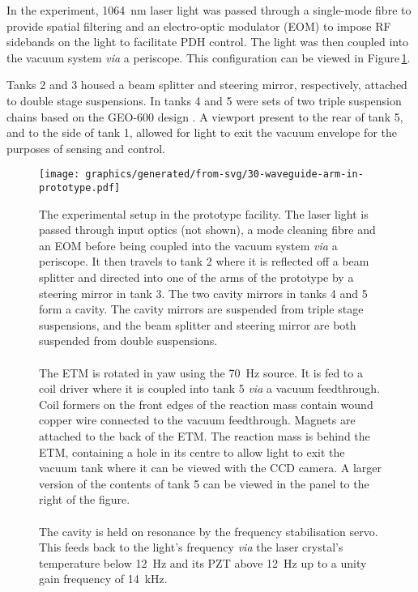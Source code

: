 In the experiment, \SI{1064}{\nano\meter} laser light was passed through a single-mode fibre to provide spatial filtering and an electro-optic modulator (\gls{EOM}) to impose RF sidebands on the light to facilitate PDH control. The light was then coupled into the vacuum system \emph{via} a periscope. This configuration can be viewed in Figure\,\ref{fig:prototype-setup}.

Tanks 2 and 3 housed a beam splitter and steering mirror, respectively, attached to double stage suspensions. In tanks 4 and 5 were sets of two triple suspension chains based on the GEO-600 design \cite{Plissi2000}. A viewport present to the rear of tank 5, and to the side of tank 1, allowed for light to exit the vacuum envelope for the purposes of sensing and control.

\begin{figure}
  \centering
  \texttt{[image: graphics/generated/from-svg/30-waveguide-arm-in-prototype.pdf]}
  \caption{\label{fig:prototype-setup}The experimental setup in the prototype facility. The laser light is passed through input optics (not shown), a mode cleaning fibre and an EOM before being coupled into the vacuum system \emph{via} a periscope. It then travels to tank 2 where it is reflected off a beam splitter and directed into one of the arms of the prototype by a steering mirror in tank 3. The two cavity mirrors in tanks 4 and 5 form a \FP{} cavity. The cavity mirrors are suspended from triple stage suspensions, and the beam splitter and steering mirror are both suspended from double suspensions. \\
  \\The \gls{ETM} is rotated in yaw using the \SI{70}{\hertz} source. It is fed to a coil driver where it is coupled into tank 5 \emph{via} a vacuum feedthrough. Coil formers on the front edges of the reaction mass contain wound copper wire connected to the vacuum feedthrough. Magnets are attached to the back of the \gls{ETM}. The reaction mass is behind the \gls{ETM}, containing a hole in its centre to allow light to exit the vacuum tank where it can be viewed with the CCD camera. A larger version of the contents of tank 5 can be viewed in the panel to the right of the figure. \\
  \\The cavity is held on resonance by the frequency stabilisation servo. This feeds back to the light's frequency \emph{via} the laser crystal's temperature below \SI{12}{\hertz} and its PZT above \SI{12}{\hertz} up to a unity gain frequency of \SI{14}{\kilo \hertz}.}
\end{figure}

